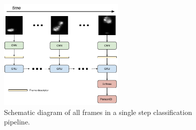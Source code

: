 \begin{figure}
	\centering
		\includegraphics[width=6cm]{./figures/rnn_pipeline.pdf}
	\caption{Schematic diagram of all frames in a single step classification pipeline.}
	\label{fig:rnn_pipeline}
\end{figure}

